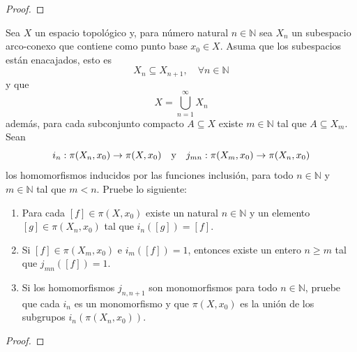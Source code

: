 \documentclass[12pt]{report}
\theoremstyle{largebreak}
\newcommand\cf[3]{\ensuremath{#1:#2\rightarrow#3}}
\begin{document}
    \begin{proof}
        
    \end{proof}

    \begin{excer}
        Sea $X$ un espacio topológico y, para número natural $n\in\mathbb{N}$ sea $X_n$ un subespacio arco-conexo que contiene como punto base $x_0\in X$. Asuma que los subespacios están enacajados, esto es
        \begin{equation*}
            X_n\subseteq X_{ n+1},\quad\forall n\in\mathbb{N}
        \end{equation*}
        y que
        \begin{equation*}
            X=\bigcup_{ n=1}^{\infty}X_n
        \end{equation*}
        además, para cada subconjunto compacto $A\subseteq X$ existe $m\in\mathbb{N}$ tal que $A\subseteq X_m$. Sean
        \begin{equation*}
            \cf{i_n}{\pi(X_n,x_0)}{\pi(X,x_0)}\quad\textup{y}\quad \cf{j_{ mn}}{\pi(X_m,x_0)}{\pi(X_n,x_0)}
        \end{equation*}
        los homomorfismos inducidos por las funciones inclusión, para todo $n\in\mathbb{N}$ y $m\in\mathbb{N}$ tal que $m<n$. Pruebe lo siguiente:
        \begin{enumerate}
            \item Para cada $[f]\in\pi(X,x_0)$ existe un natural $n\in\mathbb{N}$ y un elemento $[g]\in\pi(X_n,x_0)$ tal que $i_n([g])=[f]$.
            \item Si $[f]\in\pi(X_m,x_0)$ e $i_m([f])=1$, entonces existe un entero $n\geq m$ tal que $j_{ mn}([f])=1$.
            \item Si los homomorfismos $j_{ n,n+1}$ son monomorfismos para todo $n\in\mathbb{N}$, pruebe que cada $i_n$ es un monomorfismo y que $\pi(X,x_0)$ es la unión de los subgrupos $i_n(\pi(X_n,x_0))$.
        \end{enumerate}
    \end{excer}

    \begin{proof}
        
    \end{proof}

\end{document}
